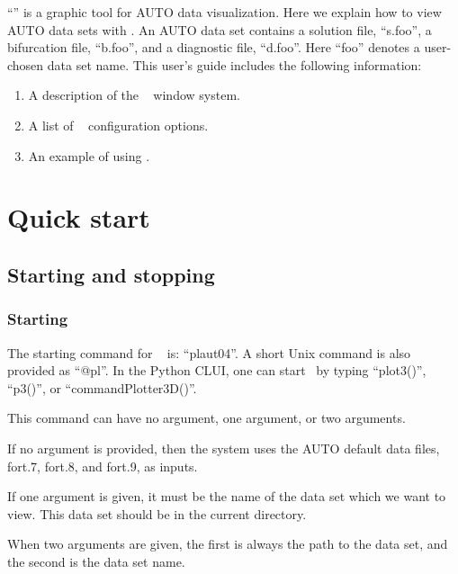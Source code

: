 

``\PLAUT'' is a graphic tool for AUTO data visualization. Here we
explain how to
view AUTO data sets with \PLAUT. An AUTO data set contains a solution file, ``s.foo'',
a bifurcation file, ``b.foo'', and a diagnostic file, ``d.foo''. Here ``foo'' denotes a user-chosen data set name.
This user's guide includes the following information:
\begin{enumerate}
    \item A description of the \PLAUT~ window system.
    \item A list of \PLAUT~ configuration options.
    \item An example of using \PLAUT.
\end{enumerate}

\section{Quick start}

\subsection{Starting and stopping \PLAUT }

\subsubsection{Starting}

The starting command for \PLAUT~ is: ``plaut04''. A short Unix command
is also provided as ``@pl''. In the Python CLUI, one can start \PLAUT
~by typing ``plot3()'', ``p3()'', or ``commandPlotter3D()''.

This command can have no argument, one argument, or two arguments.

If no argument is provided, then the system uses the AUTO default data files,
fort.7, fort.8, and fort.9, as inputs.

If one argument is given, it must be the name of the data set which we want
to view. This data set should be in the current directory.

When two arguments are given,
the first is always the path to the data set, and the second is the data set name.

